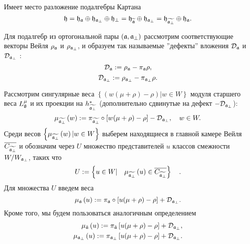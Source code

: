 Имеет место разложение подалгебры Картана
\begin{equation}
\mathfrak{h}=\frak{\mathfrak{h}_{\mathfrak{a}}}\oplus \mathfrak{h}_{\mathfrak{a}_{\perp}}\oplus
\mathfrak{h}_{\perp }=\frak{\mathfrak{h}_{\widetilde{\mathfrak{a}}}}\oplus \mathfrak{h}_{\mathfrak{a}_{\perp}}=\frak{\mathfrak{h}_{\widetilde{\mathfrak{a}_{\perp}}}}\oplus
\mathfrak{h}_{\mathfrak{a}}.
\end{equation}

Для подалгебр из ортогональной пары  $\left( \mathfrak{a},\mathfrak{a}_{\perp}\right) $ рассмотрим соответствующие векторы Вейля $\rho _{\mathfrak{a}}$ и $\rho _{\mathfrak{a}_{\perp }}$, и образуем так называемые  ''дефекты'' вложения $\mathcal{D}_{\mathfrak{a}}$ и $\mathcal{D}_{\mathfrak{a}_{\perp }}$ :
\begin{equation}
\mathcal{D}_{\mathfrak{a}}:=\rho _{\mathfrak{a}}-\pi _{\mathfrak{a}}\rho ,
\end{equation}
\begin{equation}
\label{defect-perp}
\mathcal{D}_{\mathfrak{a}_{\perp }}:=\rho _{\mathfrak{a}_{\perp }}-\pi_{\mathfrak{a}_{\perp}}\rho .
\end{equation}

Рассмотрим сингулярные веса  $\left\{\left( w(\mu +\rho )-\rho \right)|w  \in W \right\}$  модуля старшего веса  $L_{\mathfrak{g}}^{\mu }$ и их проекции на $h_{\widetilde{\mathfrak{a}_{\perp }}}^{\ast }$ (дополнительно сдвинутые на дефект $-\mathcal{D}_{\mathfrak{a}_{\perp }}$):
\begin{equation*}
\mu _{\widetilde{\af_{\perp }}}\left( w\right) :=\pi _{\widetilde{\frak{%
a}_{\perp }}}\circ\left[ w(\mu +\rho )-\rho \right] -\mathcal{D}_{\af_{\perp
}},\quad w\in W.
\end{equation*}
Среди весов  $\left\{\mu _{\widetilde{\mathfrak{a}_{\perp }}}\left( w\right)|w\in W\right\}$ выберем находящиеся в главной камере Вейля $\overline{C_{\widetilde{\mathfrak{a}_{\perp}}}}$ и обозначим через $U$ множество представителей $u$ классов смежности $W/W_{\mathfrak{a}_{\perp }}$, таких что
\begin{equation}
U:=\left\{ u\in W|\quad \mu _{\widetilde{\mathfrak{a}_{\perp }}}\left( u\right)
\in \overline{C_{\widetilde{\mathfrak{a}_{\perp }}}}\right\} \quad .
\label{U-def}
\end{equation}
Для множества  $U$ введем веса
\begin{equation*}
\mu _{\af}\left( u\right) :=\pi _{\af}\circ\left[ u(\mu +\rho )-\rho %
\right] +\mathcal{D}_{\af_{\perp }}.
\end{equation*}
Кроме того, мы будем пользоваться аналогичным определением
\begin{eqnarray}
\label{eq:136}
\mu _{\tilde {\mathfrak{a}}}\left( u\right) :=\pi _{\tilde {\mathfrak{a}}}\left[ u(\mu +\rho )-\rho \right] +\mathcal{D}_{\mathfrak{a}_{\perp}},\\
\mu _{\mathfrak{a}_{\perp}}\left( u\right) :=\pi _{\mathfrak{a}_{\perp}}\left[ u(\mu +\rho )-\rho \right] +\mathcal{D}_{\mathfrak{a}_{\perp}}.
\end{eqnarray}

